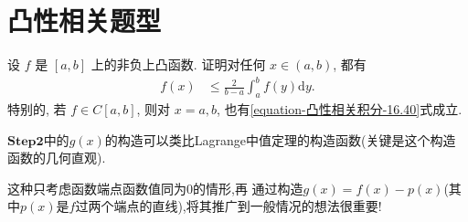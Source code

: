 \documentclass[../../main.tex]{subfiles}
\begin{document}
\section{凸性相关题型}

\begin{example}
设 $f$ 是 $[a,b]$ 上的非负上凸函数. 证明对任何 $x \in (a,b)$, 都有
\begin{align}\label{equation-凸性相关积分-16.40}
f(x) &\leqslant \frac{2}{b - a}\int_{a}^{b}f(y)\mathrm{d}y.
\end{align}
特别的, 若 $f \in C[a,b]$, 则对 $x = a,b$, 也有\eqref{equation-凸性相关积分-16.40}式成立.
\end{example}
\begin{remark}
$\mathbf{Step}\mathbf{2}$中的$g(x)$的构造可以类比Lagrange中值定理的构造函数(关键是这个构造函数的几何直观).
\end{remark}
\begin{note}
这种只考虑函数端点函数值同为0的情形,再
通过构造$g(x)=f(x)-p(x)$(其中$p(x)$是$f$过两个端点的直线),将其推广到一般情况的想法很重要!
\end{note}
\end{document}
